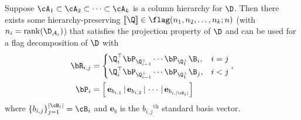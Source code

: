 \begin{prop}\label{prop:proj_prop_and_flags_app}
 Suppose $\cA_1 \subset \cA_2 \subset \cdots \subset \cA_k$ is a column hierarchy for $\D$. Then there exists some hierarchy-preserving 
 $[\![\Q]\!] \in \flag(n_1,n_2,\dots, n_k;n)$ (with $n_i = \mathrm{rank}(\D_{\mathcal{A}_i})$) 
 that satisfies the projection property of $\D$ and can be used for a flag decomposition of $\D$ with
    \begin{align}\label{eq:R_and_P}
        \bR_{i,j} &= 
        \begin{cases}
            \Q_i^\top\bP_{\Q_{i-1}^\perp}\cdots \bP_{\Q_1^\perp} \B_i, &i=j\\
            \Q_i^\top\bP_{\Q_{i-1}^\perp}\cdots \bP_{\Q_1^\perp} \B_j, &i < j
        \end{cases},\\
        \bP_i &= \left[ \,\mathbf{e}_{b_{i,1}}\,|\, \mathbf{e}_{b_{i,2}}\,|\, \cdots\,|\, \mathbf{e}_{b_{i,|\cB_i|}} \right]
    \end{align}
    where $\{b_{i,j}\}_{j=1}^{|\cB_i|} = \cB_i$ and $\mathbf{e}_{b}$ is the $b_{i,j}$$^{\mathrm{th}}$ standard basis vector.
\end{prop}
